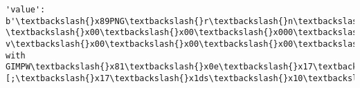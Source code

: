 \documentclass[11pt]{article}
\begin{document}
\begin{Verbatim}[commandchars=\\\{\}]
          'value': b'\textbackslash{}x89PNG\textbackslash{}r\textbackslash{}n\textbackslash{}x1a\textbackslash{}n\textbackslash{}x00\textbackslash{}x00\textbackslash{}x00\textbackslash{}rIHDR\textbackslash{}x00\textbackslash{}x00\textbackslash{}x00 \textbackslash{}x00\textbackslash{}x00\textbackslash{}x000\textbackslash{}x08\textbackslash{}x06\textbackslash{}x00\textbackslash{}x00\textbackslash{}x00p\textbackslash{}xacxo\textbackslash{}x00\textbackslash{}x00\textbackslash{}x00\textbackslash{}x06bKGD\textbackslash{}x00\textbackslash{}x85\textbackslash{}x00Q\textbackslash{}x00(\textbackslash{}xd8\textbackslash{}x8eh\textbackslash{}xe0\textbackslash{}x00\textbackslash{}x00\textbackslash{}x00\textbackslash{}tpHYs\textbackslash{}x00\textbackslash{}x00.\#\textbackslash{}x00\textbackslash{}x00.\#\textbackslash{}x01x\textbackslash{}xa5?v\textbackslash{}x00\textbackslash{}x00\textbackslash{}x00\textbackslash{}x07tIME\textbackslash{}x07\textbackslash{}xe3\textbackslash{}x04\textbackslash{}x01\textbackslash{}x07\textbackslash{}x0b4\textbackslash{}xd679\textbackslash{}xd2\textbackslash{}x00\textbackslash{}x00\textbackslash{}x00\textbackslash{}x19tEXtComment\textbackslash{}x00Created with GIMPW\textbackslash{}x81\textbackslash{}x0e\textbackslash{}x17\textbackslash{}x00\textbackslash{}x00\textbackslash{}x01\textbackslash{}xb0IDATX\textbackslash{}xc3\textbackslash{}xed\textbackslash{}x981n\textbackslash{}xc30\textbackslash{}x0cEI\textbackslash{}xc1\textbackslash{}xcd\textbackslash{}x01z\textbackslash{}x81"\textbackslash{}xc8\textbackslash{}x1e\textbackslash{}xf8\textbackslash{}x0c>\textbackslash{}x84\textbackslash{}xa7\textbackslash{}x9e"[;\textbackslash{}x17\textbackslash{}x1ds\textbackslash{}x10\textbackslash{}x1f"g\textbackslash{}x10\textbackslash{}xbc\textbackslash{}x1bA\textbackslash{}x8f\textbackslash{}xd0\textbackslash{}xd5\textbackslash{}x1d\textbackslash{}xd4\textbackslash{}xa1V\textbackslash{}xa1(\textbackslash{}x94D1\textbackslash{}xb2k 
\end{Verbatim}
\end{document}
